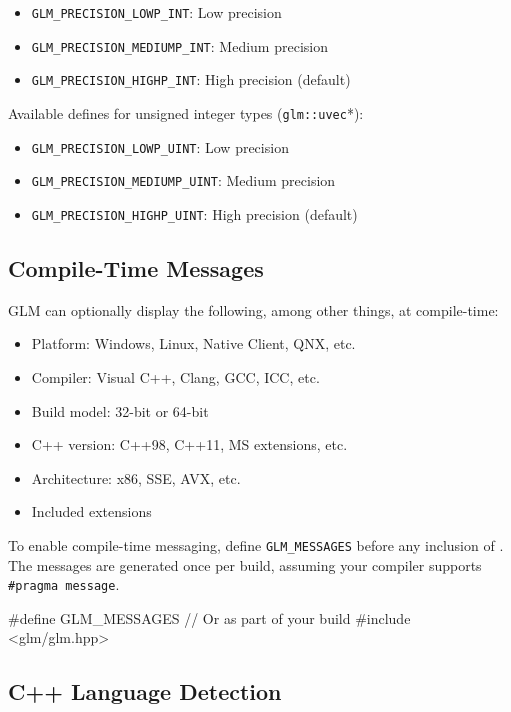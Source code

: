 \documentclass{scrartcl}
\numberwithin{figure}{subsection}
\begin{document}
\begin{itemize}
    \item \verb|GLM_PRECISION_LOWP_INT|: Low precision
    \item \verb|GLM_PRECISION_MEDIUMP_INT|: Medium precision 
    \item \verb|GLM_PRECISION_HIGHP_INT|: High precision (default)
\end{itemize}

Available defines for unsigned integer types (\verb|glm::uvec|*):

\begin{itemize}
    \item \verb|GLM_PRECISION_LOWP_UINT|: Low precision
    \item \verb|GLM_PRECISION_MEDIUMP_UINT|: Medium precision 
    \item \verb|GLM_PRECISION_HIGHP_UINT|: High precision (default)
\end{itemize}

\subsection{Compile-Time Messages}

GLM can optionally display the following, among other things, at compile-time:

\begin{itemize}
    \item Platform: Windows, Linux, Native Client, QNX, etc. 
    \item Compiler: Visual C++, Clang, GCC, ICC, etc.
    \item Build model: 32-bit or 64-bit
    \item C++ version: C++98, C++11, MS extensions, etc.
    \item Architecture: x86, SSE, AVX, etc.
    \item Included extensions
\end{itemize}

To enable compile-time messaging, define \verb|GLM_MESSAGES| before any inclusion of . The messages are generated once per build, assuming your compiler supports \verb|#pragma message|.

\begin{cppcode}
#define GLM_MESSAGES  // Or as part of your build
#include <glm/glm.hpp>
\end{cppcode}

\subsection{C++ Language Detection}
\end{document}
